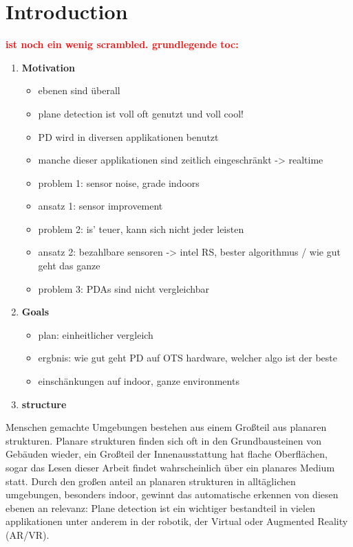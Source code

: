 \documentclass[main.tex]{subfiles}
\begin{document}
\chapter{Introduction}
\label{chap:Introduction}

\textbf{\textcolor{red}{ist noch ein wenig scrambled. grundlegende toc:}}
\begin{enumerate}
    \item \textbf{Motivation}
    \begin{itemize}
        \item ebenen sind überall
        \item plane detection ist voll oft genutzt und voll cool!
        \item PD wird in diversen applikationen benutzt
        \item manche dieser applikationen sind zeitlich eingeschränkt -> realtime
        \item problem 1: sensor noise, grade indoors
        \item ansatz 1: sensor improvement
        \item problem 2: is' teuer, kann sich nicht jeder leisten
        \item ansatz 2: bezahlbare sensoren -> intel RS, bester algorithmus / wie gut geht das ganze
        \item problem 3: PDAs sind nicht vergleichbar
    \end{itemize}
    \item \textbf{Goals}
    \begin{itemize}
        \item plan: einheitlicher vergleich
        \item ergbnis: wie gut geht PD auf OTS hardware, welcher algo ist der beste
        \item einschänkungen auf indoor, ganze environments
    \end{itemize}
    \item \textbf{structure}
\end{enumerate}
Menschen gemachte Umgebungen bestehen aus einem Großteil aus planaren strukturen. Planare strukturen finden sich oft in den Grundbausteinen von Gebäuden wieder,
 ein Großteil der Innenausstattung hat flache Oberflächen, sogar das Lesen dieser Arbeit findet wahrscheinlich über ein planares Medium statt.
Durch den großen anteil an planaren strukturen in alltäglichen umgebungen, besonders indoor, gewinnt das automatische erkennen von diesen ebenen an relevanz:
Plane detection ist ein wichtiger bestandteil in vielen applikationen unter anderem in der robotik, der Virtual oder Augmented Reality (AR/VR). 
\end{document}
